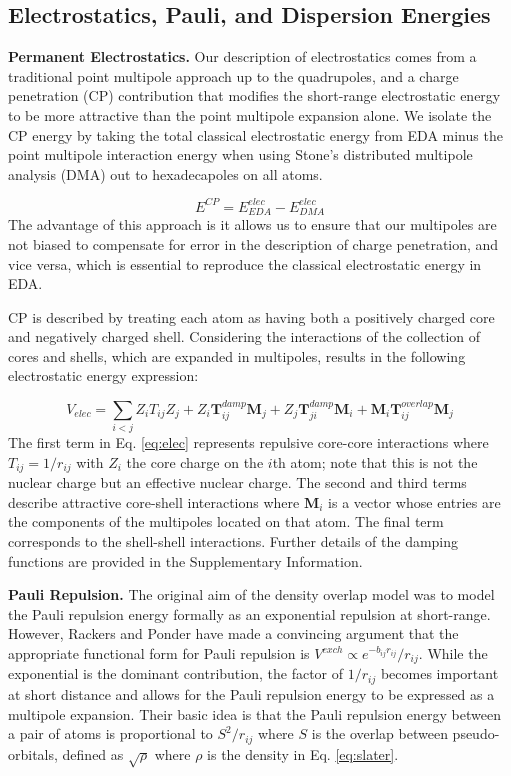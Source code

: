 \documentclass[journal=jctcce,manuscript=article]{achemso}
\begin{document}
\subsection*{Electrostatics, Pauli, and Dispersion Energies}
\textbf{Permanent Electrostatics.} Our description of electrostatics comes from a traditional point multipole approach up to the quadrupoles, and a charge penetration (CP) contribution that modifies the short-range electrostatic energy to be more attractive than the point multipole expansion alone. We isolate the CP energy by taking the total classical electrostatic energy from EDA minus the point multipole interaction energy when using Stone's distributed multipole analysis (DMA)\cite{stone1981distributed,stone1985distributeda}
out to hexadecapoles on all atoms.

\begin{equation}
  E^{CP}=E^{elec}_{EDA}-E^{elec}_{DMA}
  \label{eq:cp}
\end{equation}
The advantage of this approach is it allows us to ensure that our multipoles are not biased to compensate for error in the description of charge penetration, and vice versa, which is essential to reproduce the classical electrostatic energy in EDA.

CP is described by treating each atom as having both a positively charged core and negatively charged shell. Considering the interactions of the collection of cores and shells, which are expanded in multipoles, results in the following electrostatic energy expression:

\begin{equation}
  V_{elec}=\sum_{i<j}Z_iT_{ij}Z_j+Z_i\bm{T}_{ij}^{damp}\bm{M}_j+Z_j\bm{T}_{ji}^{damp}\bm{M}_i+\bm{M}_i\bm{T}_{ij}^{overlap}\bm{M}_j
  \label{eq:elec}
\end{equation}
The first term in Eq. \ref{eq:elec} represents repulsive core-core interactions where $T_{ij}=1/r_{ij}$ with $Z_i$ the core charge on the $i$th atom; note that this is not the nuclear charge but an effective nuclear charge. The second and third terms describe attractive core-shell interactions where $\bm{M}_i$ is a vector whose entries are the components of the multipoles located on that atom. The final term corresponds to the shell-shell interactions. Further details of the damping functions are provided in the Supplementary Information.

\textbf{Pauli Repulsion.} The original aim of the density overlap model was to model the
Pauli repulsion energy formally as an exponential
repulsion at short-range.\cite{wallqvist1989new,wheatley1990overlap,gordon1996approximate} However, Rackers and Ponder have made a convincing argument that the appropriate
functional form for Pauli repulsion is 
$V^{exch}\propto e^{-b_{ij}r_{ij}}/r_{ij}$.\cite{rackers2019classical,rackers2021polarizable}
While the exponential is the dominant contribution, the factor of $1/r_{ij}$
becomes important at short distance and allows for the Pauli repulsion energy
to be expressed as a multipole expansion. Their basic idea is that the Pauli repulsion energy
between a pair of atoms is proportional to $S^2/r_{ij}$ where $S$ is the overlap between pseudo-orbitals, defined as $\sqrt{\rho}$ where $\rho$ is the density in Eq. \ref{eq:slater}.
\end{document}
